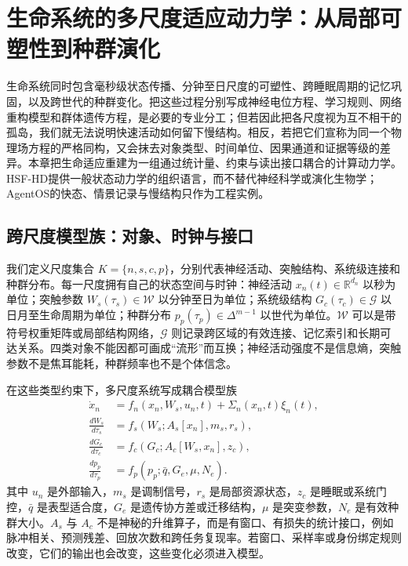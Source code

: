 \chapter{生命系统的多尺度适应动力学：从局部可塑性到种群演化}
\label{chp:life_manifold_dynamics}

生命系统同时包含毫秒级状态传播、分钟至日尺度的可塑性、跨睡眠周期的记忆巩固，以及跨世代的种群变化。把这些过程分别写成神经电位方程、学习规则、网络重构模型和群体遗传方程，是必要的专业分工；但若因此把各尺度视为互不相干的孤岛，我们就无法说明快速活动如何留下慢结构。相反，若把它们宣称为同一个物理场方程的严格同构，又会抹去对象类型、时间单位、因果通道和证据等级的差异。本章把生命适应重建为一组通过统计量、约束与读出接口耦合的计算动力学。HSF-HD提供一般状态动力学的组织语言，而不替代神经科学或演化生物学；AgentOS的快态、情景记录与慢结构只作为工程实例。

\section{跨尺度模型族：对象、时钟与接口}
\label{sec:breaking_scale_barriers}
\label{sec:unified_action_across_scales}

我们定义尺度集合 $K=\{n,s,c,p\}$，分别代表神经活动、突触结构、系统级连接和种群分布。每一尺度拥有自己的状态空间与时钟：神经活动 $x_n(t)\in\mathbb{R}^{d_n}$ 以秒为单位；突触参数 $W_s(\tau_s)\in\mathcal W$ 以分钟至日为单位；系统级结构 $G_c(\tau_c)\in\mathcal G$ 以日月至生命周期为单位；种群分布 $p_p(\tau_p)\in\Delta^{m-1}$ 以世代为单位。$\mathcal W$ 可以是带符号权重矩阵或局部结构网络，$\mathcal G$ 则记录跨区域的有效连接、记忆索引和长期可达关系。四类对象不能因都可画成“流形”而互换；神经活动强度不是信息熵，突触参数不是焦耳能耗，种群频率也不是个体信念。

在这些类型约束下，多尺度系统写成耦合模型族
\begin{align}
 \dot x_n &= f_n(x_n,W_s,u_n,t)+\Sigma_n(x_n,t)\xi_n(t),\\
 \frac{dW_s}{d\tau_s} &= f_s(W_s;A_s[x_n],m_s,r_s),\\
 \frac{dG_c}{d\tau_c} &= f_c(G_c;A_c[W_s,x_n],z_c),\\
 \frac{dp_p}{d\tau_p} &= f_p(p_p;\bar q,G_e,\mu,N_e).
\end{align}
其中 $u_n$ 是外部输入，$m_s$ 是调制信号，$r_s$ 是局部资源状态，$z_c$ 是睡眠或系统门控，$\bar q$ 是表型适合度，$G_e$ 是遗传协方差或迁移结构，$\mu$ 是突变参数，$N_e$ 是有效种群大小。$A_s$ 与 $A_c$ 不是神秘的升维算子，而是有窗口、有损失的统计接口，例如脉冲相关、预测残差、回放次数和跨任务复现率。若窗口、采样率或身份绑定规则改变，它们的输出也会改变，这些变化必须进入模型。

